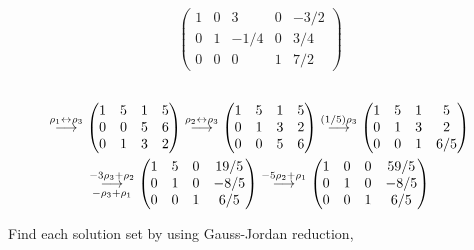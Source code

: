 \begin{exercises}
\begin{answer}
\begin{exparts}
\begin{multline*}
            \begin{pmatrix}
              1  &0  &3    &0  &-3/2  \\
              0  &1  &-1/4 &0  &3/4     \\
              0  &0  &0    &1  &7/2
            \end{pmatrix}
          \end{multline*}
        \partsitem \ \begin{multline*}
            \grstep{\rho_1\leftrightarrow\rho_3}
            \begin{pmatrix}
              1  &5  &1  &5  \\
              0  &0  &5  &6  \\
              0  &1  &3  &2
            \end{pmatrix}
            \grstep{\rho_2\leftrightarrow\rho_3}
            \begin{pmatrix}
              1  &5  &1  &5  \\
              0  &1  &3  &2  \\
              0  &0  &5  &6
            \end{pmatrix}                  
            \grstep{(1/5)\rho_3}
            \begin{pmatrix}
              1  &5  &1  &5  \\
              0  &1  &3  &2  \\
              0  &0  &1  &6/5
            \end{pmatrix}                  \\
            \grstep[-\rho_3+\rho_1]{-3\rho_3+\rho_2}
            \begin{pmatrix}
              1  &5  &0  &19/5  \\
              0  &1  &0  &-8/5  \\
              0  &0  &1  &6/5
            \end{pmatrix}                  
            \grstep{-5\rho_2+\rho_1}
            \begin{pmatrix}
              1  &0  &0  &59/5  \\
              0  &1  &0  &-8/5  \\
              0  &0  &1  &6/5
            \end{pmatrix}
          \end{multline*}
      \end{exparts}  
    \end{answer}
  \recommended \item 
    Find each solution set by using Gauss-Jordan reduction,

\end{exercises}
